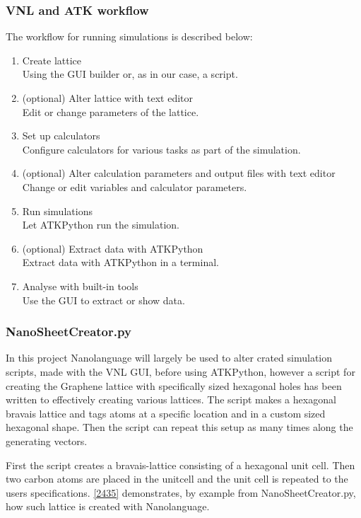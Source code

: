 \subsubsection{VNL and ATK workflow}
The workflow for running simulations is described below:
\begin{enumerate}
 \item Create lattice\\
       Using the GUI builder or, as in our case, a script.
 \item (optional) Alter lattice with text editor\\
       Edit or change parameters of the lattice.
 \item Set up calculators\\
       Configure calculators for various tasks as part of the simulation.
 \item (optional) Alter calculation parameters and output files with text editor\\
       Change or edit variables and calculator parameters.
 \item Run simulations\\
       Let ATKPython run the simulation.
 \item (optional) Extract data with ATKPython\\
       Extract data with ATKPython in a terminal.
 \item Analyse with built-in tools\\
       Use the GUI to extract or show data.
\end{enumerate}
\subsubsection{NanoSheetCreator.py}
In this project Nanolanguage will largely be used to alter crated simulation scripts, made with the VNL GUI, before using ATKPython, however a script for creating the Graphene lattice with specifically sized hexagonal holes has been written to effectively creating various lattices. The script makes a hexagonal bravais lattice and tags atoms at a specific location and in a custom sized hexagonal shape. Then the script can repeat this setup as many times along the generating vectors.

First the script creates a bravais-lattice consisting of a hexagonal unit cell. Then two carbon atoms are placed in the unitcell and the unit cell is repeated to the users specifications. \cref{2435} demonstrates, by example from NanoSheetCreator.py, how such lattice is created with Nanolanguage.
\onecolumngrid


